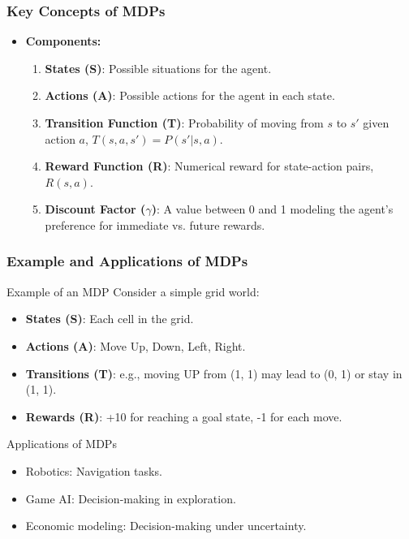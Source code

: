 \documentclass[aspectratio=169]{beamer}
\begin{document}
\begin{frame}[fragile]
    \frametitle{Key Concepts of MDPs}
    \begin{itemize}
        \item \textbf{Components:}
        \begin{enumerate}
            \item \textbf{States (S)}: Possible situations for the agent.
            \item \textbf{Actions (A)}: Possible actions for the agent in each state.
            \item \textbf{Transition Function (T)}: Probability of moving from \( s \) to \( s' \) given action \( a \), \( T(s, a, s') = P(s' | s, a) \).
            \item \textbf{Reward Function (R)}: Numerical reward for state-action pairs, \( R(s, a) \).
            \item \textbf{Discount Factor ($\gamma$)}: A value between 0 and 1 modeling the agent's preference for immediate vs. future rewards.
        \end{enumerate}
    \end{itemize}
\end{frame}

\begin{frame}[fragile]
    \frametitle{Example and Applications of MDPs}
    \begin{block}{Example of an MDP}
        Consider a simple grid world:
        \begin{itemize}
            \item \textbf{States (S)}: Each cell in the grid.
            \item \textbf{Actions (A)}: Move Up, Down, Left, Right.
            \item \textbf{Transitions (T)}: e.g., moving UP from (1, 1) may lead to (0, 1) or stay in (1, 1).
            \item \textbf{Rewards (R)}: +10 for reaching a goal state, -1 for each move.
        \end{itemize}
    \end{block}
    \begin{block}{Applications of MDPs}
        \begin{itemize}
            \item Robotics: Navigation tasks.
            \item Game AI: Decision-making in exploration.
            \item Economic modeling: Decision-making under uncertainty.
        \end{itemize}
    \end{block}
\end{frame}
\end{document}
